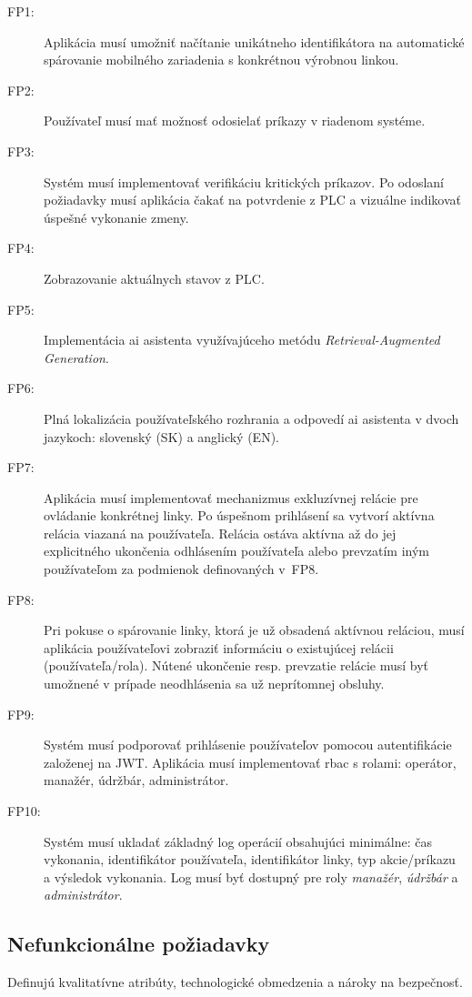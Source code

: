 \begin{description}
      \item [FP1:] Aplikácia musí umožniť načítanie unikátneho identifikátora na automatické spárovanie mobilného zariadenia s konkrétnou výrobnou linkou.
      \item [FP2:] Používateľ musí mať možnosť odosielať príkazy v riadenom systéme.
      \item [FP3:] Systém musí implementovať verifikáciu kritických príkazov. Po odoslaní požiadavky musí aplikácia čakať na potvrdenie z PLC a vizuálne indikovať úspešné vykonanie zmeny.
      \item [FP4:] Zobrazovanie aktuálnych stavov z PLC.
      \item [FP5:] Implementácia \acrshort{ai} asistenta využívajúceho metódu \textit{Retrieval-Augmented Generation}. 
      \item [FP6:] Plná lokalizácia používateľského rozhrania a odpovedí \acrshort{ai} asistenta v dvoch jazykoch: slovenský (SK) a anglický (EN).
      \item [FP7:] Aplikácia musí implementovať mechanizmus exkluzívnej relácie pre ovládanie konkrétnej linky. Po úspešnom prihlásení sa vytvorí aktívna relácia viazaná na používateľa. Relácia ostáva aktívna až do jej explicitného ukončenia odhlásením používateľa alebo prevzatím iným používateľom za podmienok definovaných v~FP8.
      \item [FP8:] Pri pokuse o spárovanie linky, ktorá je už obsadená aktívnou reláciou, musí aplikácia používateľovi zobraziť informáciu o existujúcej relácii (používateľa/rola). Nútené ukončenie resp. prevzatie relácie musí byť umožnené v prípade neodhlásenia sa už neprítomnej obsluhy.
      \item [FP9:] Systém musí podporovať prihlásenie používateľov pomocou autentifikácie založenej na JWT. Aplikácia musí implementovať \acrshort{rbac} s rolami: operátor, manažér, údržbár, administrátor.
      \item [FP10:] Systém musí ukladať základný log operácií obsahujúci minimálne: čas vykonania, identifikátor používateľa, identifikátor linky, typ akcie/príkazu a výsledok vykonania. Log musí byť dostupný pre roly \textit{manažér}, \textit{údržbár} a \textit{administrátor}.
\end{description}

\subsection{Nefunkcionálne požiadavky}
Definujú kvalitatívne atribúty, technologické obmedzenia a nároky na
bezpečnosť.

